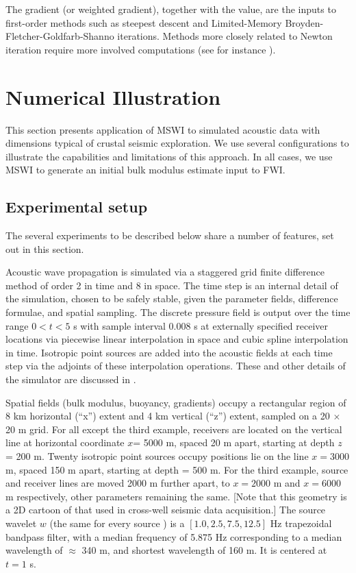 The gradient (or weighted gradient), together with the value, are the
inputs to first-order methods such as steepest descent and
Limited-Memory Broyden-Fletcher-Goldfarb-Shanno
iterations. Methods more closely related to Newton iteration require
more involved computations (see for instance \cite{Kaufman:75}). 

\section{Numerical Illustration}


This section presents application of MSWI to simulated acoustic data with dimensions
typical of crustal seismic exploration. We use several configurations
to illustrate the capabilities and limitations of this approach. In
all cases, we use MSWI to generate an initial bulk modulus estimate
input to FWI.

\subsection{Experimental setup}

The several experiments to be described below share a number of
features, set out in this section. 

Acoustic wave
propagation is simulated via a staggered grid finite difference method
\cite[]{vir86,lev88,Cohen:01} of order 2 in time and 8 in space. The time
step is an internal detail of the simulation, chosen to be safely
stable, given the parameter fields, difference formulae, and 
spatial sampling. The discrete pressure field is
output over the time range $0 < t < 5$ s with sample interval $0.008$
s at externally specified receiver locations
via piecewise linear interpolation in space and cubic spline
interpolation in time. Isotropic point sources are added
into the acoustic fields at each time step via the adjoints of these
interpolation operations. These and other details of the simulator are
discussed in \cite{GeoPros:11}.

Spatial fields (bulk modulus, buoyancy, gradients) occupy a
rectangular region of 8 km horizontal (``x'') extent and 4 km vertical
(``z'') extent, sampled on a 20 $\times$ 20 m grid. For all except the
third example, receivers are located on the vertical line at
horizontal coordinate $x$= 5000 m, spaced 20 m apart, starting at
depth $z$ = 200 m. Twenty isotropic point sources occupy positions lie
on the line $x=3000$ m, spaced 150 m apart, starting at depth = 500
m. For the third example, source and receiver lines are moved 2000 m
further apart, to $x=2000$ m and $x=6000$ m respectively, other
parameters remaining the same. [Note that this geometry is a 2D
cartoon of that used in cross-well seismic data acquisition.] The
source wavelet $w$ (the same for every source ) is a
$[1.0, 2.5, 7.5, 12.5]$ Hz trapezoidal bandpass filter, with a median
frequency of 5.875 Hz corresponding to a median wavelength of
$\approx$ 340 m, and shortest wavelength of 160 m. It is centered at
$t=1$ s.

